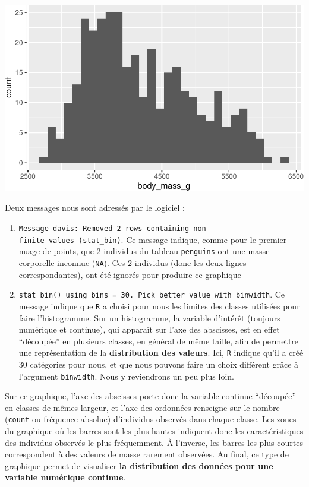\documentclass[
  a4paper,
  DIV=11,
  numbers=noendperiod,
  oneside]{scrreprt}
\providecommand{\tightlist}{%
  \setlength{\itemsep}{0pt}\setlength{\parskip}{0pt}}\usepackage{longtable,booktabs,array}
\begin{document}
\includegraphics{03-visualization_files/figure-pdf/unnamed-chunk-8-1.pdf}

Deux messages nous sont adressés par le logiciel :

\begin{enumerate}
\def\labelenumi{\arabic{enumi}.}
\tightlist
\item
  \texttt{Message\ d\textquotesingle{}avis:\ Removed\ 2\ rows\ containing\ non-finite\ values\ (stat\_bin)}.
  Ce message indique, comme pour le premier nuage de points, que 2
  individus du tableau \texttt{penguins} ont une masse corporelle
  inconnue (\texttt{NA}). Ces 2 individus (donc les deux lignes
  correspondantes), ont été ignorés pour produire ce graphique
\item
  \texttt{\textquotesingle{}stat\_bin()\textquotesingle{}\ using\ \textquotesingle{}bins\ =\ 30\textquotesingle{}.\ Pick\ better\ value\ with\ \textquotesingle{}binwidth\textquotesingle{}}.
  Ce message indique que \texttt{R} a choisi pour nous les limites des
  classes utilisées pour faire l'histogramme. Sur un histogramme, la
  variable d'intérêt (toujours numérique et continue), qui apparaît sur
  l'axe des abscisses, est en effet ``découpée'' en plusieurs classes,
  en général de même taille, afin de permettre une représentation de la
  \textbf{distribution des valeurs}. Ici, \texttt{R} indique qu'il a
  créé 30 catégories pour nous, et que nous pouvons faire un choix
  différent grâce à l'argument \texttt{binwidth}. Nous y reviendrons un
  peu plus loin.
\end{enumerate}

Sur ce graphique, l'axe des abscisses porte donc la variable continue
``découpée'' en classes de mêmes largeur, et l'axe des ordonnées
renseigne sur le nombre (\texttt{count} ou fréquence absolue)
d'individus observés dans chaque classe. Les zones du graphique où les
barres sont les plus hautes indiquent donc les caractéristiques des
individus observés le plus fréquemment. À l'inverse, les barres les plus
courtes correspondent à des valeurs de masse rarement observées. Au
final, ce type de graphique permet de visualiser \textbf{la distribution
des données pour une variable numérique continue}.
\end{document}
